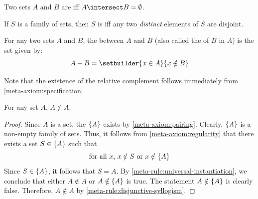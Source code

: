\begin{dfn}[Disjoint]
     \label{dfn:metatheory-disjoint-sets}
    Two sets \( A \) and \( B \) are  iff \( A \intersect B = \emptyset \).
\end{dfn}

\begin{dfn}
     \label{dfn:metatheory-pairwise-disjoint-sets}
    If \( S \) is a family of sets, then \( S \) is  iff any two \emph{distinct} elements of \( S \) are disjoint.
\end{dfn}

\begin{dfn}[Difference]
     \label{dfn:metatheory-the-difference-of-two-sets}
    For any two sets \( A \) and \( B \), the  between \( A \) and \( B \) (also called the  of \( B \) in \( A \))
    is the set given by:
    \begin{equation*}
        A - B = \setbuilder{x \in A}{\text{\(x \notin B\)}}
    \end{equation*}
\end{dfn}

\begin{rem}
    Note that the existence of the relative complement follows immediately from \cref{meta-axiom:specification}.
\end{rem}

\begin{thm}
     \label{thm:metatheory-no-set-is-an-element-of-itself}
    For any set \( A \), \( A \notin A \).
\end{thm}

\begin{proof}
    Since \( A \) is a set, the  \( \mleft\{ A \mright\} \) exists by \cref{meta-axiom:pairing}.
    Clearly, \( \mleft\{ A \mright\} \) is a non-empty family of sets.
    Thus, it follows from \cref{meta-axiom:regularity} that there exists a set \( S \in \mleft\{ A \mright\} \) such that
    \begin{equation*}
        \text{for all \( x \), \( x \notin S \) or \( x \notin \mleft\{ A \mright\} \)}
    \end{equation*}
    Since \( S \in \mleft\{ A \mright\} \), it follows that \( S = A \).
    By \cref{meta-rule:universal-instantiation}, we conclude that either \( A \notin A \) or \( A \notin \mleft\{ A \mright\} \) is true.
    The statement \( A \notin \mleft\{ A \mright\} \) is clearly false. Therefore, \( A \notin A \) by \cref{meta-rule:disjunctive-syllogism}.
\end{proof}

